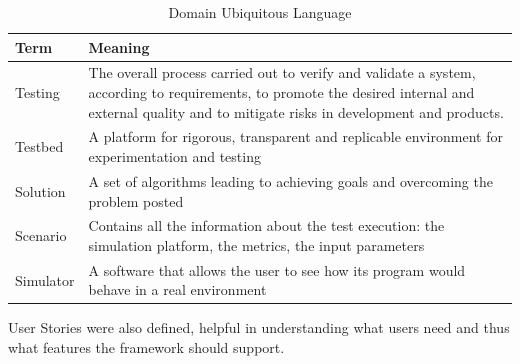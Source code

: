 \documentclass[12pt,a4paper,openright,twoside]{book}
\begin{document}
\begin{table}[h]
  \centering
  \begin{tabular}{|l|p{}|}
    \toprule
    \textbf{Term} & \textbf{Meaning}                                                                                                                                                                                    \\
    \midrule
    Testing       & The overall process carried out to verify and validate a system, according to requirements, to promote the desired internal and external quality and to mitigate risks in development and products. \\ \hline
    Testbed       & A platform for rigorous, transparent and replicable environment for experimentation and testing                                                                                                     \\ \hline
    Solution      & A set of algorithms leading to achieving goals and overcoming the problem posted                                                                                                                    \\ \hline
    Scenario      & Contains all the information about the test execution: the simulation platform, the metrics, the input parameters                                                                                   \\ \hline
    Simulator     & A software that allows the user to see how its program would behave in a real environment                                                                                                           \\ \hline
  \end{tabular}
  \caption{Domain Ubiquitous Language}
\end{table}

User Stories were also defined, helpful in understanding what users need and thus what features the framework should support.
\end{document}
